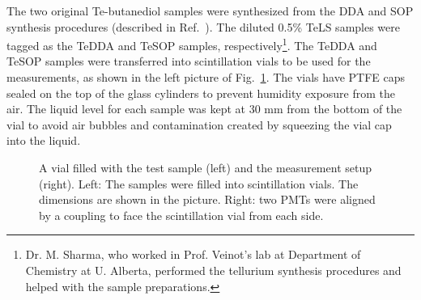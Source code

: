 The two original Te-butanediol samples were synthesized from the DDA and SOP synthesis procedures (described in Ref.~\cite{teLoadingPaper}). The diluted 0.5\% TeLS samples were tagged as the TeDDA and TeSOP samples, respectively\footnote{Dr. M. Sharma, who worked in Prof. Veinot's lab at Department of Chemistry at U. Alberta, performed the tellurium synthesis procedures and helped with the sample preparations.}. The TeDDA and TeSOP samples were transferred into scintillation vials to be used for the measurements, as shown in the left picture of Fig.~\ref{scintVial}. The vials have PTFE caps sealed on the top of the glass cylinders to prevent humidity exposure from the air. The liquid level for each sample was kept at 30 mm from the bottom of the vial to avoid air bubbles and contamination created by squeezing the vial cap into the liquid.

\begin{figure}[htbp]
	\caption[A vial filled with the test sample and the measurement setup.]{A vial filled with the test sample (left) and the measurement setup (right). Left: The samples were filled into scintillation vials. The dimensions are shown in the picture. Right: two PMTs were aligned by a coupling to face the scintillation vial from each side.\label{scintVial}}
\end{figure}


